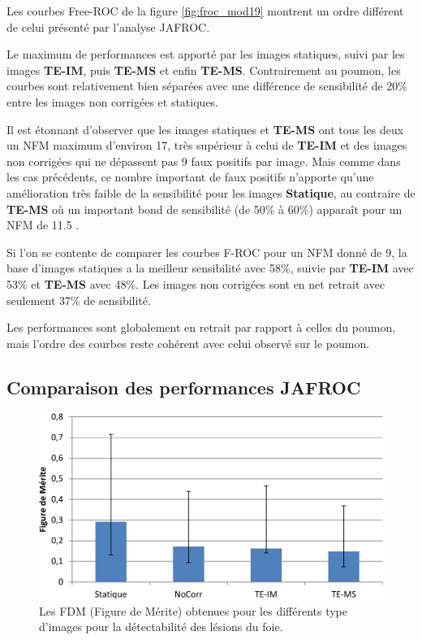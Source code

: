 Les courbes Free-ROC de la figure \ref{fig:froc_mod19} montrent un ordre différent de celui présenté par l'analyse JAFROC.

Le maximum de performances est apporté par les images statiques, suivi par les images \textbf{TE-IM}, puis \textbf{TE-MS} et enfin \textbf{TE-MS}. Contrairement au poumon, les courbes sont relativement bien séparées avec une différence de sensibilité de 20\% entre les images non corrigées et statiques. 

Il est étonnant d'observer que les images statiques et \textbf{TE-MS} ont tous les deux un NFM maximum d'environ 17, très supérieur à celui de \textbf{TE-IM} et des images non corrigées qui ne dépassent pas 9 faux positifs par image. Mais comme dans les cas précédents, ce nombre important de faux positifs n'apporte qu'une amélioration très faible de la sensibilité pour les images \textbf{Statique}, au contraire de \textbf{TE-MS} où un important bond de sensibilité (de 50\% à 60\%) apparaît pour un NFM de 11.5 . 

Si l'on se contente de comparer les courbes F-ROC pour un NFM donné de 9, la base d'images statiques a la meilleur sensibilité avec 58\%, suivie par \textbf{TE-IM} avec 53\% et \textbf{TE-MS} avec 48\%. Les images non corrigées sont en net retrait avec seulement 37\% de sensibilité.

Les performances sont globalement en retrait par rapport à celles du poumon, mais l'ordre des courbes reste cohérent avec celui observé sur le poumon.


\subsection{Comparaison des performances JAFROC}

\begin{figure}[h!]
 \begin{center}
   \includegraphics[width=15cm]{images/FOM_mod19}
 \end{center}
 \caption{Les FDM (Figure de Mérite) obtenues pour les différents type d'images pour la détectabilité des lésions du foie.}
 \label{fig:fom_mod19} 
\end{figure}


